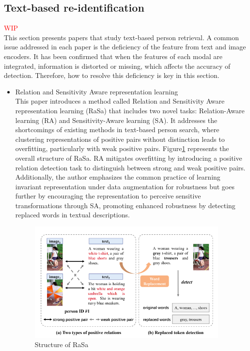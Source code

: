 \subsection{Text-based re-identification}
\textcolor{red}{WIP}\\
This section presents papers that study text-based person retrieval. A common issue addressed in each paper is the deficiency of the feature from text and image encoders. It has been confirmed that when the features of each modal are integrated, information is distorted or missing, which affects the accuracy of detection. Therefore, how to resolve this deficiency is key in this section.

\begin{itemize}
    \item Relation and Sensitivity Aware representation learning\\
    This paper introduces a method called Relation and Sensitivity Aware representation learning (RaSa) that includes two novel tasks: Relation-Aware learning (RA) and Sensitivity-Aware learning (SA). It addresses the shortcomings of existing methods in text-based person search, where clustering representations of positive pairs without distinction leads to overfitting, particularly with weak positive pairs. Figure\ref{fig:rasa} represents the overall structure of RaSa. RA mitigates overfitting by introducing a positive relation detection task to distinguish between strong and weak positive pairs. Additionally, the author emphasizes the common practice of learning invariant representation under data augmentation for robustness but goes further by encouraging the representation to perceive sensitive transformations through SA, promoting enhanced robustness by detecting replaced words in textual descriptions.
    \begin{figure}[htbp]
        \begin{center}
            \includegraphics[width=10cm]{img/rasa.png}
            \caption{Structure of RaSa}\label{fig:rasa}
        \end{center}
    \end{figure}
    

\end{itemize}
